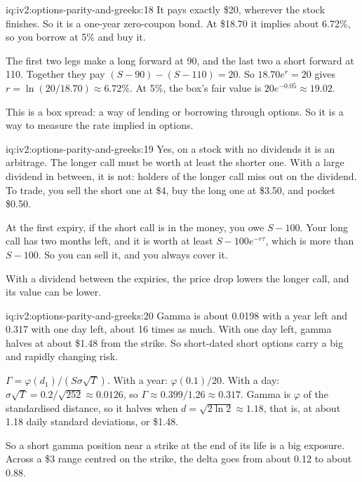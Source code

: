 \begin{solution}{iq:iv2:options-parity-and-greeks:18}
It pays exactly \$20, wherever the stock finishes. So it is a one-year zero-coupon bond. At \$18.70 it implies about 6.72\%, so you borrow at 5\% and buy it.

The first two legs make a long forward at 90, and the last two a short forward at 110. Together they pay $(S - 90) - (S - 110) = 20$. So $18.70e^{r} = 20$ gives $r = \ln(20/18.70) \approx 6.72\%$. At 5\%, the box's fair value is $20e^{-0.05} \approx 19.02$.

This is a box spread: a way of lending or borrowing through options. So it is a way to measure the rate implied in options.

\end{solution}

\begin{solution}{iq:iv2:options-parity-and-greeks:19}
Yes, on a stock with no dividends it is an arbitrage. The longer call must be worth at least the shorter one. With a large dividend in between, it is not: holders of the longer call miss out on the dividend. To trade, you sell the short one at \$4, buy the long one at \$3.50, and pocket \$0.50.

At the first expiry, if the short call is in the money, you owe $S - 100$. Your long call has two months left, and it is worth at least $S - 100e^{-r\tau}$, which is more than $S - 100$. So you can sell it, and you always cover it.

With a dividend between the expiries, the price drop lowers the longer call, and its value can be lower.

\end{solution}

\begin{solution}{iq:iv2:options-parity-and-greeks:20}
Gamma is about 0.0198 with a year left and 0.317 with one day left, about 16 times as much. With one day left, gamma halves at about \$1.48 from the strike. So short-dated short options carry a big and rapidly changing risk.

$\Gamma = \varphi(d_1)/(S\sigma\sqrt T)$. With a year: $\varphi(0.1)/20$. With a day: $\sigma\sqrt T = 0.2/\sqrt{252} \approx 0.0126$, so $\Gamma \approx 0.399/1.26 \approx 0.317$. Gamma is $\varphi$ of the standardised distance, so it halves when $d = \sqrt{2\ln 2} \approx 1.18$, that is, at about 1.18 daily standard deviations, or \$1.48.

So a short gamma position near a strike at the end of its life is a big exposure. Across a \$3 range centred on the strike, the delta goes from about 0.12 to about 0.88.

\end{solution}

